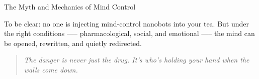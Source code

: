 \begin{PsychologicalSidebar}{The Myth and Mechanics of Mind Control}
  \medskip
  
  To be clear: no one is injecting mind-control nanobots into your tea. But under the right conditions 
  —-- pharmacological, social, and emotional —-- the mind can be opened, rewritten, and quietly 
  redirected.
  
  \begin{quote}
  \textit{The danger is never just the drug. It’s who’s holding your hand when the walls come down.}
  \end{quote}
  
\end{PsychologicalSidebar}

\medskip

